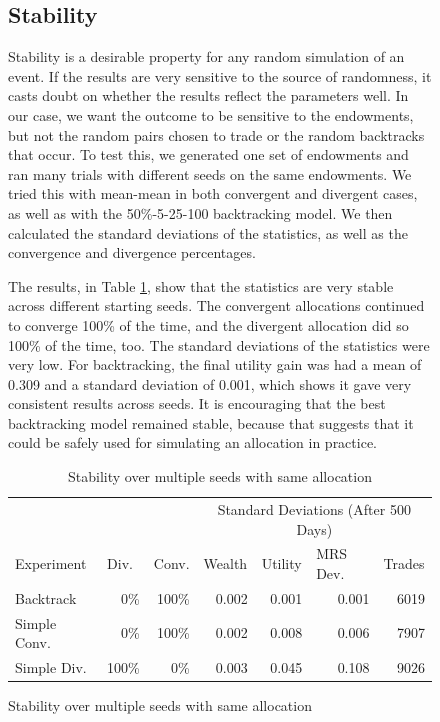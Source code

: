 \documentclass[12pt,a4paper,titlepage]{article}
\newcommand{\co}[1]{\textsf{#1}}
\begin{document}
\begin{figure}[H]
\subsection{Stability}
Stability is a desirable property for any random simulation of an event.
If the results are very sensitive to the source of randomness, it casts doubt on whether the results reflect the parameters well.
In our case, we want the outcome to be sensitive to the endowments, but not the random pairs chosen to trade or the random backtracks that occur. 
To test this, we generated one set of endowments and ran many trials with different seeds on the same endowments.
We tried this with \co{mean}-\co{mean} in both convergent and divergent cases, as well as with the 50\%-5-25-100 backtracking model.
We then calculated the standard deviations of the statistics, as well as the convergence and divergence percentages.

The results, in Table \ref{tab:stable}, show that the statistics are very stable across different starting seeds.
The convergent allocations continued to converge 100\% of the time, and the divergent allocation did so 100\% of the time, too.
The standard deviations of the statistics were very low.
For backtracking, the final utility gain was had a mean of 0.309 and a standard deviation of 0.001, which shows it gave very consistent results across seeds.
It is encouraging that the best backtracking model remained stable, because that suggests that it could be safely used for simulating an allocation in practice.

\begin{table}[h]
  \begin{tabular}{l|rr|rrrr}
    & \multicolumn{1}{l}{} & \multicolumn{1}{l}{} & \multicolumn{ 4}{|c}{Standard Deviations (After 500 Days)} \\ 
    Experiment & \multicolumn{1}{l}{Div.} & \multicolumn{1}{l|}{Conv.} & \multicolumn{1}{l}{Wealth} & \multicolumn{1}{l}{Utility} & \multicolumn{1}{l}{MRS Dev.} & \multicolumn{1}{l}{Trades} \\ 
    \hline
    Backtrack & 0\% & 100\% & 0.002 & 0.001 & 0.001 & 6019 \\ 
    Simple Conv. & 0\% & 100\% & 0.002 & 0.008 & 0.006 & 7907 \\ 
    Simple Div. & 100\% & 0\% & 0.003 & 0.045 & 0.108 & 9026 \\ 
  \end{tabular}
  \caption{Stability over multiple seeds with same allocation}
  \label{tab:stable}
\end{table}




\end{figure}
\end{document}
